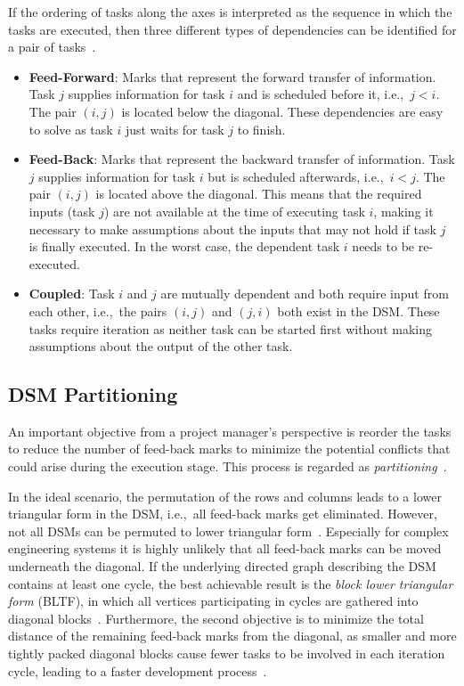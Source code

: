 \documentclass[12pt]{article}
\theoremstyle{definition}
\begin{document}
If the ordering of tasks along the axes is interpreted as the sequence in which the tasks are executed, then three different types of dependencies can be identified for a pair of tasks~\cite{Yassine2001AnIT}.

\begin{itemize}
	\item \textbf{Feed-Forward}: Marks that represent the forward transfer of information. Task $j$ supplies information for task $i$ and is scheduled before it, i.e.,~$j < i$. The pair $(i,j)$ is located below the diagonal. These dependencies are easy to solve as task $i$ just waits for task $j$ to finish.
	\item \textbf{Feed-Back}: Marks that represent the backward transfer of information. Task $j$ supplies information for task $i$ but is scheduled afterwards, i.e.,~$i < j$. The pair $(i, j)$ is located above the diagonal. This means that the required inputs (task $j$) are not available at the time of executing task $i$, making it necessary to make assumptions about the inputs that may not hold if task $j$ is finally executed. In the worst case, the dependent task $i$ needs to be re-executed.
	\item \textbf{Coupled}: Task $i$ and $j$ are mutually dependent and both require input from each other, i.e.,~the pairs $(i, j)$ and $(j,i)$ both exist in the DSM. These tasks require iteration as neither task can be started first without making assumptions about the output of the other task.
\end{itemize}

\subsection{DSM Partitioning}

An important objective from a project manager's perspective is reorder the tasks to reduce the number of feed-back marks to minimize the potential conflicts that could arise during the execution stage. This process is regarded as \textit{partitioning}~\cite{steward1981,Yassine01091999}.

In the ideal scenario, the permutation of the rows and columns leads to a lower triangular form in the DSM, i.e.,~all feed-back marks get eliminated. However, not all DSMs can be permuted to lower triangular form~\cite{Yassine2001AnIT,hossain_addendum}. Especially for complex engineering systems it is highly unlikely that all feed-back marks can be moved underneath the diagonal. If the underlying directed graph describing the DSM contains at least one cycle, the best achievable result is the \textit{block lower triangular form} (BLTF), in which all vertices participating in cycles are gathered into diagonal blocks~\cite{hossain_addendum}. Furthermore, the second objective is to minimize the total distance of the remaining feed-back marks from the diagonal, as smaller and more tightly packed diagonal blocks cause fewer tasks to be involved in each iteration cycle, leading to a faster development process~\cite{eppinger2012}.
\end{document}
